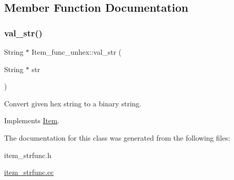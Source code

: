 \subsection{Member Function Documentation}
\mbox{\label{classItem__func__unhex_a87230a96263c6c5324a6aba9a815a183}} 
\subsubsection{\texorpdfstring{val\+\_\+str()}{val\_str()}}
{\footnotesize\ttfamily String $\ast$ Item\+\_\+func\+\_\+unhex\+::val\+\_\+str (\begin{DoxyParamCaption}\item[{String $\ast$}]{str }\end{DoxyParamCaption})\hspace{0.3cm}{\ttfamily [virtual]}}

Convert given hex string to a binary string. 

Implements \mbox{\hyperlink{classItem}{Item}}.



The documentation for this class was generated from the following files\+:\begin{DoxyCompactItemize}
\item 
item\+\_\+strfunc.\+h\item 
\mbox{\hyperlink{item__strfunc_8cc}{item\+\_\+strfunc.\+cc}}\end{DoxyCompactItemize}
